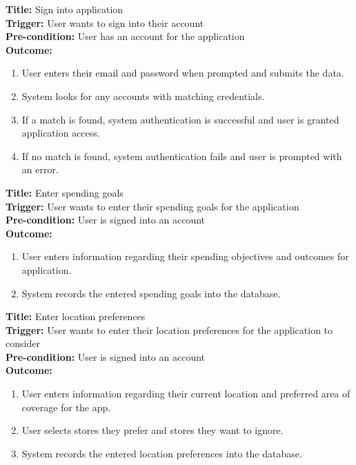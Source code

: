 \documentclass[12pt]{article}
\begin{document}
\medskip
\noindent \textbf{Title:} Sign into application\\
\textbf{Trigger:} User wants to sign into their account\\
\textbf{Pre-condition:} User has an account for the application\\
\textbf{Outcome:}
\begin{enumerate}
  \item User enters their email and password when prompted and submits the data.
  \item System looks for any accounts with matching credentials.
  \item If a match is found, system authentication is successful and user is granted application access.
  \item If no match is found, system authentication fails and user is prompted with an error.
\end{enumerate}

\medskip
\noindent \textbf{Title:} Enter spending goals\\
\textbf{Trigger:} User wants to enter their spending goals for the application\\
\textbf{Pre-condition:} User is signed into an account\\
\textbf{Outcome:}
\begin{enumerate}
  \item User enters information regarding their spending objectives and outcomes for application.
  \item System records the entered spending goals into the database.
\end{enumerate}

\medskip
\noindent \textbf{Title:} Enter location preferences\\
\textbf{Trigger:} User wants to enter their location preferences for the application to consider\\
\textbf{Pre-condition:} User is signed into an account\\
\textbf{Outcome:}
\begin{enumerate}
  \item User enters information regarding their current location and preferred area of coverage for the app.
  \item User selects stores they prefer and stores they want to ignore.
  \item System records the entered location preferences into the database.
\end{enumerate}
\end{document}
